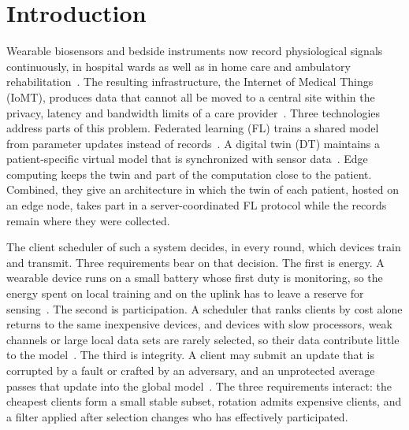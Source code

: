 \section{Introduction}
\label{sec:intro}

Wearable biosensors and bedside instruments now record physiological signals continuously, in hospital wards as well as in home care and ambulatory rehabilitation~\cite{rudsari2025digital,khan2024implementing}. The resulting infrastructure, the Internet of Medical Things (IoMT), produces data that cannot all be moved to a central site within the privacy, latency and bandwidth limits of a care provider~\cite{nguyen2022federated,rauniyar2024federated}. Three technologies address parts of this problem. Federated learning (FL) trains a shared model from parameter updates instead of records~\cite{mcmahan2017communication,kairouz2021advances}. A digital twin (DT) maintains a patient-specific virtual model that is synchronized with sensor data~\cite{corral2020digital,kamelboulos2021digital}. Edge computing keeps the twin and part of the computation close to the patient. Combined, they give an architecture in which the twin of each patient, hosted on an edge node, takes part in a server-coordinated FL protocol while the records remain where they were collected.

The client scheduler of such a system decides, in every round, which devices train and transmit. Three requirements bear on that decision. The first is energy. A wearable device runs on a small battery whose first duty is monitoring, so the energy spent on local training and on the uplink has to leave a reserve for sensing~\cite{yang2021energy,arouj2022towards}. The second is participation. A scheduler that ranks clients by cost alone returns to the same inexpensive devices, and devices with slow processors, weak channels or large local data sets are rarely selected, so their data contribute little to the model~\cite{cho2022towards,huang2021efficiency}. The third is integrity. A client may submit an update that is corrupted by a fault or crafted by an adversary, and an unprotected average passes that update into the global model~\cite{blanchard2017machine,yin2018byzantine}. The three requirements interact: the cheapest clients form a small stable subset, rotation admits expensive clients, and a filter applied after selection changes who has effectively participated.

